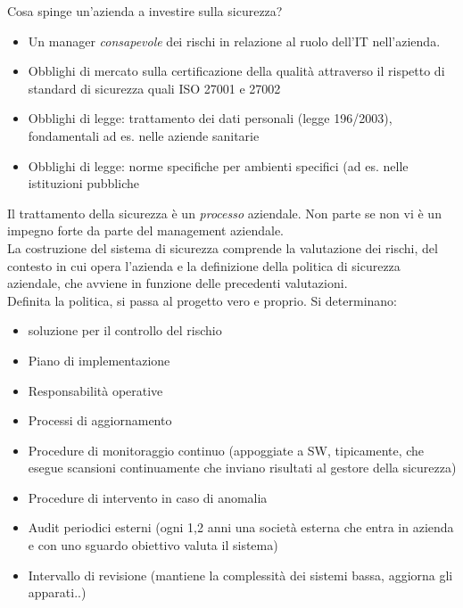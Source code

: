 Cosa spinge un'azienda a investire sulla sicurezza?

\begin{itemize}

\item
  Un manager \emph{consapevole} dei rischi in relazione al ruolo dell'IT
  nell'azienda.\\
\item
  Obblighi di mercato sulla certificazione della qualit\`a attraverso il
  rispetto di standard di sicurezza quali ISO 27001 e 27002
\item
  Obblighi di legge: trattamento dei dati personali (legge 196/2003),
  fondamentali ad es. nelle aziende sanitarie
\item
  Obblighi di legge: norme specifiche per ambienti specifici (ad es.
  nelle istituzioni pubbliche
\end{itemize}

Il trattamento della sicurezza \`e un \emph{processo} aziendale. Non parte
se non vi \`e un impegno forte da parte del management aziendale.\\
La costruzione del sistema di sicurezza comprende la valutazione dei
rischi, del contesto in cui opera l'azienda e la definizione della
politica di sicurezza aziendale, che avviene in funzione delle
precedenti valutazioni.\\
Definita la politica, si passa al progetto vero e proprio. Si
determinano:

\begin{itemize}

\item
  soluzione per il controllo del rischio
\item
  Piano di implementazione
\item
  Responsabilit\`a operative
\item
  Processi di aggiornamento
\item
  Procedure di monitoraggio continuo (appoggiate a SW, tipicamente, che
  esegue scansioni continuamente che inviano risultati al gestore della
  sicurezza)
\item
  Procedure di intervento in caso di anomalia
\item
  Audit periodici esterni (ogni 1,2 anni una societ\`a esterna che entra
  in azienda e con uno sguardo obiettivo valuta il sistema)
\item
  Intervallo di revisione (mantiene la complessit\`a dei sistemi bassa,
  aggiorna gli apparati..)
\end{itemize}

